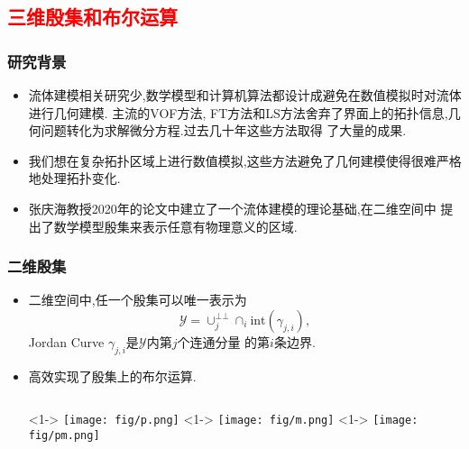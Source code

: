 \documentclass[UTF8]{ctexbeamer}	%
\theoremstyle{plain}
\theoremstyle{definition}
\theoremstyle{remark}
\numberwithin{equation}{section}
\begin{document}
\subsection{\textcolor{red}{三维殷集和布尔运算}}
\begin{frame}
    \frametitle{研究背景}
    \begin{itemize}
        \item 流体建模相关研究少,数学模型和计算机算法都设计成避免在数值模拟时对流体
        进行几何建模.
        主流的VOF方法, FT方法和LS方法舍弃了界面上的拓扑信息,几何问题转化为求解微分方程.过去几十年这些方法取得
        了大量的成果.
        \item 我们想在复杂拓扑区域上进行数值模拟,这些方法避免了几何建模使得很难严格地处理拓扑变化.
        \item 张庆海教授2020年的论文中建立了一个流体建模的理论基础,在二维空间中
        提出了数学模型殷集来表示任意有物理意义的区域.
    \end{itemize}
\end{frame}

\begin{frame}
    \frametitle{二维殷集}
    \begin{itemize}
        \item 二维空间中,任一个殷集可以唯一表示为
        \[\mathcal{Y} = \cup_j^{\bot \bot}\cap_i \text{int}(\gamma_{j, i} ),\]
        Jordan Curve $\gamma_{j, i}$是$\mathcal{Y}$内第$j$个连通分量
        的第$i$条边界.
        \item 高效实现了殷集上的布尔运算. 
        \begin{columns}
            <1->
                \texttt{[image: fig/p.png]}
            <1->
            \texttt{[image: fig/m.png]}
            <1->
            \texttt{[image: fig/pm.png]}
        \end{columns}
    \end{itemize}
\end{frame}
\end{document}
